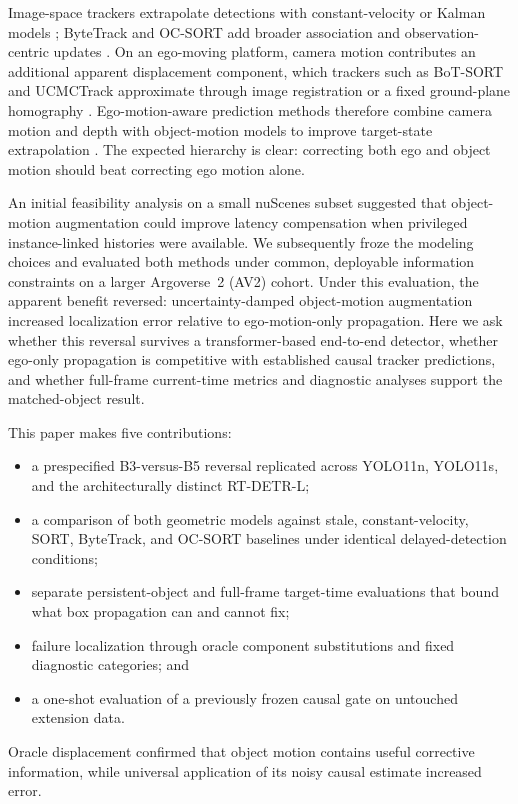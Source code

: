 \documentclass[journal]{IEEEtran}
\begin{document}
Image-space trackers extrapolate detections with constant-velocity or Kalman models \cite{Kalman1960,Bewley2016SORT}; ByteTrack and OC-SORT add broader association and observation-centric updates \cite{Zhang2022ByteTrack,Cao2023OCSORT}. On an ego-moving platform, camera motion contributes an additional apparent displacement component, which trackers such as BoT-SORT and UCMCTrack approximate through image registration or a fixed ground-plane homography \cite{Aharon2022BoTSORT,Yi2024UCMCTrack}. Ego-motion-aware prediction methods therefore combine camera motion and depth with object-motion models to improve target-state extrapolation \cite{Mahdian2024EMAP}. The expected hierarchy is clear: correcting both ego and object motion should beat correcting ego motion alone.

An initial feasibility analysis on a small nuScenes subset suggested that object-motion augmentation could improve latency compensation when privileged instance-linked histories were available. We subsequently froze the modeling choices and evaluated both methods under common, deployable information constraints on a larger Argoverse~2 (AV2) cohort. Under this evaluation, the apparent benefit reversed: uncertainty-damped object-motion augmentation increased localization error relative to ego-motion-only propagation. Here we ask whether this reversal survives a transformer-based end-to-end detector, whether ego-only propagation is competitive with established causal tracker predictions, and whether full-frame current-time metrics and diagnostic analyses support the matched-object result.

This paper makes five contributions:
\begin{itemize}
\item a prespecified B3-versus-B5 reversal replicated across YOLO11n, YOLO11s, and the architecturally distinct RT-DETR-L;
\item a comparison of both geometric models against stale, constant-velocity, SORT, ByteTrack, and OC-SORT baselines under identical delayed-detection conditions;
\item separate persistent-object and full-frame target-time evaluations that bound what box propagation can and cannot fix;
\item failure localization through oracle component substitutions and fixed diagnostic categories; and
\item a one-shot evaluation of a previously frozen causal gate on untouched extension data.
\end{itemize}
Oracle displacement confirmed that object motion contains useful corrective information, while universal application of its noisy causal estimate increased error.
\end{document}
